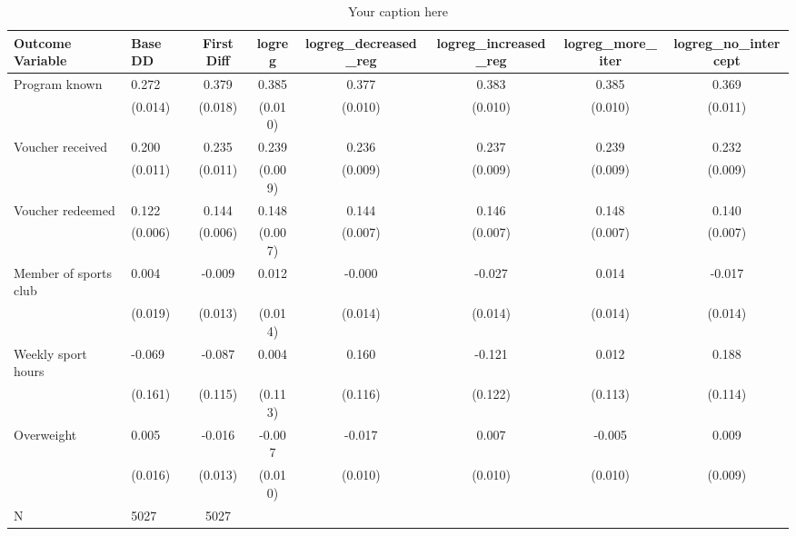 \begin{sidewaystable*}
\centering
\begin{tabular}{llcccccc}
\hline
Outcome Variable & Base DD & First Diff & logreg & logreg_decreased_reg & logreg_increased_reg & logreg_more_iter & logreg_no_intercept \\
\hline
Program known & 0.272 & 0.379 & 0.385 & 0.377 & 0.383 & 0.385 & 0.369 \\
  & (0.014) & (0.018) & (0.010) & (0.010) & (0.010) & (0.010) & (0.011) \\
Voucher received & 0.200 & 0.235 & 0.239 & 0.236 & 0.237 & 0.239 & 0.232 \\
  & (0.011) & (0.011) & (0.009) & (0.009) & (0.009) & (0.009) & (0.009) \\
Voucher redeemed & 0.122 & 0.144 & 0.148 & 0.144 & 0.146 & 0.148 & 0.140 \\
  & (0.006) & (0.006) & (0.007) & (0.007) & (0.007) & (0.007) & (0.007) \\
Member of sports club & 0.004 & -0.009 & 0.012 & -0.000 & -0.027 & 0.014 & -0.017 \\
  & (0.019) & (0.013) & (0.014) & (0.014) & (0.014) & (0.014) & (0.014) \\
Weekly sport hours & -0.069 & -0.087 & 0.004 & 0.160 & -0.121 & 0.012 & 0.188 \\
  & (0.161) & (0.115) & (0.113) & (0.116) & (0.122) & (0.113) & (0.114) \\
Overweight & 0.005 & -0.016 & -0.007 & -0.017 & 0.007 & -0.005 & 0.009 \\
  & (0.016) & (0.013) & (0.010) & (0.010) & (0.010) & (0.010) & (0.009) \\
\hline
N & 5027 & 5027  &  &  &  &  \\
\hline
\end{tabular}
\caption{Your caption here}
\label{tab:your_label}
\end{sidewaystable*}